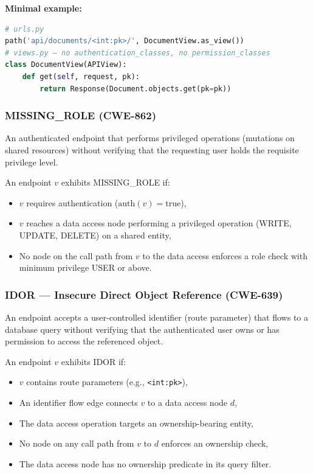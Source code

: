\textbf{Minimal example:}
\begin{lstlisting}[language=Python, basicstyle=\small\ttfamily]
# urls.py
path('api/documents/<int:pk>/', DocumentView.as_view())
# views.py — no authentication_classes, no permission_classes
class DocumentView(APIView):
    def get(self, request, pk):
        return Response(Document.objects.get(pk=pk))
\end{lstlisting}

\subsubsection{MISSING\_ROLE (CWE-862)}

An authenticated endpoint that performs privileged operations (mutations on shared resources) without verifying that the requesting user holds the requisite privilege level.

\begin{definition}
An endpoint $v$ exhibits MISSING\_ROLE if:
\begin{itemize}
    \item $v$ requires authentication ($\text{auth}(v) = \text{true}$),
    \item $v$ reaches a data access node performing a privileged operation (WRITE, UPDATE, DELETE) on a shared entity,
    \item No node on the call path from $v$ to the data access enforces a role check with minimum privilege USER or above.
\end{itemize}
\end{definition}

\subsubsection{IDOR — Insecure Direct Object Reference (CWE-639)}

An endpoint accepts a user-controlled identifier (route parameter) that flows to a database query without verifying that the authenticated user owns or has permission to access the referenced object.

\begin{definition}
An endpoint $v$ exhibits IDOR if:
\begin{itemize}
    \item $v$ contains route parameters (e.g., \texttt{<int:pk>}),
    \item An identifier flow edge connects $v$ to a data access node $d$,
    \item The data access operation targets an ownership-bearing entity,
    \item No node on any call path from $v$ to $d$ enforces an ownership check,
    \item The data access node has no ownership predicate in its query filter.
\end{itemize}
\end{definition}

